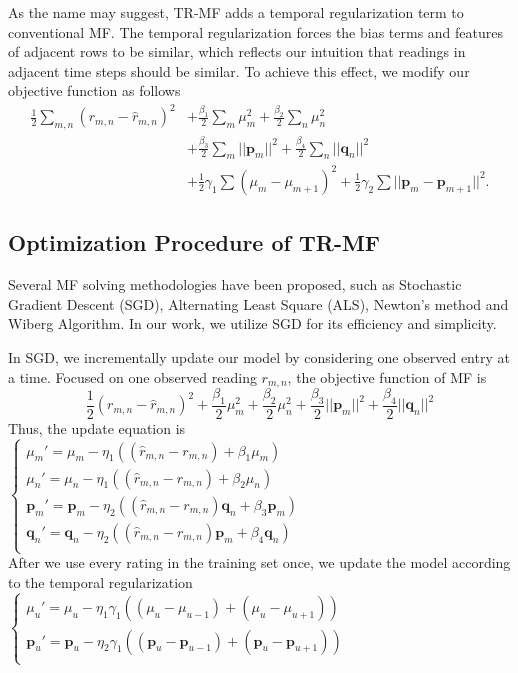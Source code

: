 As the name may suggest, TR-MF adds a temporal regularization term to conventional MF.
The temporal regularization forces the bias terms and features of adjacent rows to be similar, which reflects our intuition that readings in adjacent time steps should be similar.
To achieve this effect, we modify our objective function as follows 
\begin{equation*}\begin{aligned}
\frac{1}{2}\sum_{m,n}{(r_{m,n} - \hat{r}_{m,n})}^2 &+ \frac{\beta_1}{2}\sum_m{\mu_m^2} + \frac{\beta_2}{2}\sum_n{\mu_n^2}\\
&+ \frac{\beta_3}{2}\sum_m{||\mathbf{p}_m||^2} + \frac{\beta_4}{2}\sum_n{||\mathbf{q}_n||^2}\\ 
&+ \frac{1}{2}\gamma_1\sum{(\mu_m-\mu_{m+1})^2} + \frac{1}{2}\gamma_2\sum{||\mathbf{p}_m-\mathbf{p}_{m+1}||^2}.
\end{aligned}\end{equation*}

\subsection{Optimization Procedure of TR-MF}
\label{optimation_procedure}
Several MF solving methodologies have been proposed, such as Stochastic Gradient Descent (SGD)\cite{koren2009matrix,chih2008large}, Alternating Least Square (ALS)\cite{koren2009matrix,zhou2008large}, Newton's method\cite{buchanan2005damped} and Wiberg Algorithm\cite{okatani2007wiberg}.
In our work, we utilize SGD for its efficiency and simplicity. 

In SGD, we incrementally update our model by considering one observed entry at a time.
Focused on one observed reading $r_{m,n}$, the objective function of MF is
\begin{equation*} \frac{1}{2}(r_{m,n} - \hat{r}_{m,n})^2 + \frac{\beta_1}{2}\mu_m^2 + \frac{\beta_2}{2}\mu_n^2 + \frac{\beta_3}{2}||\mathbf{p}_m||^2 + \frac{\beta_4}{2}||\mathbf{q}_n||^2\end{equation*}
Thus, the update equation is\\
$\begin{cases}
	\mu_m' = \mu_m - \eta_1 ((\hat{r}_{m,n}-r_{m,n}) + \beta_1 \mu_m) \\
	\mu_n' = \mu_n - \eta_1 ((\hat{r}_{m,n}-r_{m,n}) + \beta_2 \mu_n) \\
	\mathbf{p}_{m}' = \mathbf{p}_{m} - \eta_2 ((\hat{r}_{m,n}-r_{m,n})\mathbf{q}_{n} + \beta_3 \mathbf{p}_{m})\\
	\mathbf{q}_{n}' = \mathbf{q}_{n} - \eta_2 ((\hat{r}_{m,n}-r_{m,n})\mathbf{p}_{m} + \beta_4 \mathbf{q}_{n})\\
\end{cases}$\\
After we use every rating in the training set once, we update the model according to the temporal regularization
$\begin{cases}
	\mu_u' = \mu_u - \eta_1 \gamma_1((\mu_u-\mu_{u-1})+(\mu_u-\mu_{u+1}))\\
	\mathbf{p}_{u}' = \mathbf{p}_{u} - \eta_2 \gamma_1((\mathbf{p}_{u}-\mathbf{p}_{u-1})+(\mathbf{p}_{u}-\mathbf{p}_{u+1}))\\
\end{cases}$

